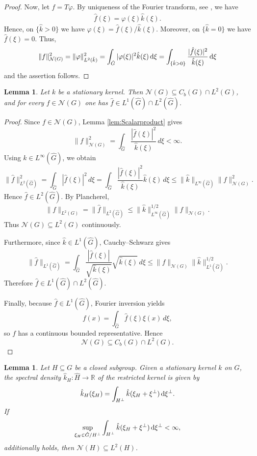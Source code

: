 \documentclass{article}
\renewcommand{\d}{\, \textup{d}}
\newtheorem{lemma}[theorem]{Lemma}
\newcommand{\R}{\mathbb{R}}
\begin{document}
\begin{appendices}
\begin{proof}
Now, let $f = T \varphi$. By uniqueness of the Fourier transform, see \cite[Theorem 4.33]{Folland}, we have 
\begin{align*}
    \hat{f}(\xi) = \varphi(\xi) \hat{k}(\xi).
\end{align*}
Hence, on $\{\hat{k}>0\}$ we have $\varphi(\xi)=\hat{f}(\xi)/\hat{k}(\xi)$. Moreover, on $\{\hat{k} = 0 \}$ we have $\hat{f}(\xi)=0$. Thus,
\begin{align*}
    \Vert f \Vert_{\mathcal{N}(G)}^2= \Vert \varphi \Vert_{L^2(\hat k )}^2 = \int_{\hat{G}} \vert \varphi(\xi)\vert^2 \hat{k}(\xi) \d \xi = \int_{\{\hat{k}>0\}} \frac{\vert \hat{f} (\xi) \vert^2}{\hat{k}(\xi)} \d \xi
\end{align*}
and the assertion follows.
\end{proof}


\begin{lemma}\label{lem:RKHSProperties}
    Let $k$ be a stationary kernel. Then $ \mathcal{N}(G) \subseteq C_b(G) \cap L^2(G)$, and for every $f \in \mathcal{N}(G)$ one has $\hat{f} \in L^1(\hat{G}) \cap L^2(\hat{G}) $. 
\end{lemma}
\begin{proof}
Since \(f\in\mathcal N(G)\), Lemma \ref{lem:Scalarproduct} gives
\[
\|f\|_{\mathcal N(G)}^2
=
\int_{\hat G}
\frac{|\hat f(\xi)|^2}{\hat k(\xi)}\,d\xi
<\infty.
\]
Using \(\hat k\in L^\infty(\hat G)\), we obtain
\[
\|\hat f\|_{L^2(\hat G)}^2
=
\int_{\hat G}|\hat f(\xi)|^2\,d\xi
=
\int_{\hat G}
\frac{|\hat f(\xi)|^2}{\hat k(\xi)}
\hat k(\xi)\,d\xi
\le
\|\hat k\|_{L^\infty(\hat G)}
\|f\|_{\mathcal N(G)}^2.
\]
Hence \(\hat f\in L^2(\hat G)\). By Plancherel,
\[
\|f\|_{L^2(G)}
=
\|\hat f\|_{L^2(\hat G)}
\le
\|\hat k\|_{L^\infty(\hat G)}^{1/2}
\|f\|_{\mathcal N(G)}.
\]
Thus \(\mathcal N(G)\subseteq L^2(G)\) continuously.

Furthermore, since \(\hat k\in L^1(\hat G)\), Cauchy--Schwarz gives
\[
\|\hat f\|_{L^1(\hat G)}
=
\int_{\hat G}
\frac{|\hat f(\xi)|}{\sqrt{\hat k(\xi)}}
\sqrt{\hat k(\xi)}\,d\xi
\le
\|f\|_{\mathcal N(G)}
\|\hat k\|_{L^1(\hat G)}^{1/2}.
\]
Therefore \(\hat f\in L^1(\hat G)\cap L^2(\hat G)\).

Finally, because \(\hat f\in L^1(\hat G)\), Fourier inversion yields
\[
f(x)=\int_{\hat G}\hat f(\xi)\xi(x)\,d\xi,
\]
so \(f\) has a continuous bounded representative. Hence
\[
\mathcal N(G)\subseteq C_b(G)\cap L^2(G).
\]
\end{proof}


\begin{lemma}\label{lem:INL2}
Let $H \subseteq G$ be a closed subgroup. Given a stationary kernel $k$ on $G$, the spectral density $\hat{k}_H:\hat{H} \to \R$ of the restricted kernel is given by 
\begin{align*}
    \hat{k}_H(\xi_H)= \int_{H^\perp} \hat{k}(\xi_H+\xi^\perp) \d \xi^\perp.
\end{align*}
If 
\begin{align}\label{eq:L2Condition}
    \sup_{\xi_H \in \hat{G}/H^\perp} \int_{H^\perp} \hat{k}(\xi_H + \xi^\perp) \d \xi^\perp < \infty,
\end{align}
additionally holds, then $\mathcal{N}(H) \subseteq L^2(H)$. 


\end{lemma}
\end{appendices}
\end{document}
